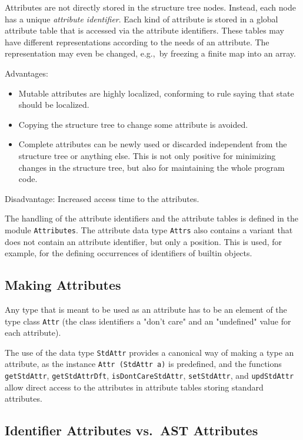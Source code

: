 \documentclass{report}
\newcommand{\code}[1]{\texttt{#1}}
\begin{document}
Attributes are not directly stored in the structure tree nodes. Instead, each
node has a unique \emph{attribute identifier}. Each kind of attribute is stored
in a global attribute table that is accessed via the attribute
identifiers. These tables may have different representations according to the
needs of an attribute. The representation may even be changed, e.g.,\ by
freezing a finite map into an array.

Advantages:
%
\begin{itemize}
\item Mutable attributes are highly localized, conforming to rule saying that
  state should be localized.
\item Copying the structure tree to change some attribute is avoided.
\item Complete attributes can be newly used or discarded independent from the
  structure tree or anything else. This is not only positive for minimizing
  changes in the structure tree, but also for maintaining the whole program
  code.
\end{itemize}

Disadvantage: Increased access time to the attributes.

The handling of the attribute identifiers and the attribute tables is defined
in the module \code{Attributes}.  The attribute data type \code{Attrs} also
contains a variant that does not contain an attribute identifier, but only a
position.  This is used, for example, for the defining occurrences of
identifiers of builtin objects.

\subsection{Making Attributes}

Any type that is meant to be used as an attribute has to be an element of the
type class \code{Attr} (the class identifiers a "don't care" and an
"undefined" value for each attribute).

The use of the data type \code{StdAttr} provides a canonical way of making a
type an attribute, as the instance \code{Attr (StdAttr a)} is predefined, and
the functions \code{getStdAttr}, \code{getStdAttrDft},
\code{isDontCareStdAttr}, \code{setStdAttr}, and \code{updStdAttr} allow
direct access to the attributes in attribute tables storing standard
attributes. 

\subsection{Identifier Attributes vs.\ AST Attributes}
\end{document}
